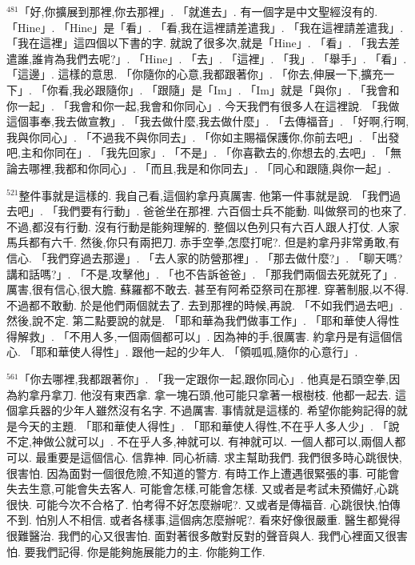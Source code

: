 \documentclass{book}
\begin{document}
$^{481}$「好,你擴展到那裡,你去那裡」.
「就進去」.
有一個字是中文聖經沒有的.
「Hine」.
「Hine」是「看」.
「看,我在這裡請差遣我」.
「我在這裡請差遣我」.
「我在這裡」這四個以下書的字.
就說了很多次,就是「Hine」.
「看」.
「我去差遣誰,誰肯為我們去呢?」.
「Hine」.
「去」.
「這裡」.
「我」.
「舉手」.
「看」.
「這邊」.
這樣的意思.
「你隨你的心意,我都跟著你」.
「你去,伸展一下,擴充一下」.
「你看,我必跟隨你」.
「跟隨」是「Im」.
「Im」就是「與你」.
「我會和你一起」.
「我會和你一起,我會和你同心」.
今天我們有很多人在這裡說.
「我做這個事奉,我去做宣教」.
「我去做什麼,我去做什麼」.
「去傳福音」.
「好啊,行啊,我與你同心」.
「不過我不與你同去」.
「你如主賜福保護你,你前去吧」.
「出發吧,主和你同在」.
「我先回家」.
「不是」.
「你喜歡去的,你想去的,去吧」.
「無論去哪裡,我都和你同心」.
「而且,我是和你同去」.
「同心和跟隨,與你一起」.

$^{521}$整件事就是這樣的.
我自己看,這個約拿丹真厲害.
他第一件事就是說.
「我們過去吧」.
「我們要有行動」.
爸爸坐在那裡.
六百個士兵不能動.
叫做祭司的也來了.
不過,都沒有行動.
沒有行動是能夠理解的.
整個以色列只有六百人跟人打仗.
人家馬兵都有六千.
然後,你只有兩把刀.
赤手空拳,怎麼打呢?.
但是約拿丹非常勇敢,有信心.
「我們穿過去那邊」.
「去人家的防營那裡」.
「那去做什麼?」.
「聊天嗎?講和話嗎?」.
「不是,攻擊他」.
「也不告訴爸爸」.
「那我們兩個去死就死了」.
厲害,很有信心,很大膽.
蘇羅都不敢去.
甚至有阿希亞祭司在那裡.
穿著制服,以不得.
不過都不敢動.
於是他們兩個就去了.
去到那裡的時候,再說.
「不如我們過去吧」.
然後,說不定.
第二點要說的就是.
「耶和華為我們做事工作」.
「耶和華使人得性得解救」.
「不用人多,一個兩個都可以」.
因為神的手,很厲害.
約拿丹是有這個信心.
「耶和華使人得性」.
跟他一起的少年人.
「領呱呱,隨你的心意行」.

$^{561}$「你去哪裡,我都跟著你」.
「我一定跟你一起,跟你同心」.
他真是石頭空拳,因為約拿丹拿刀.
他沒有東西拿.
拿一塊石頭,他可能只拿著一根樹枝.
他都一起去.
這個拿兵器的少年人雖然沒有名字.
不過厲害.
事情就是這樣的.
希望你能夠記得的就是今天的主題.
「耶和華使人得性」.
「耶和華使人得性,不在乎人多人少」.
「說不定,神做公就可以」.
不在乎人多,神就可以.
有神就可以.
一個人都可以,兩個人都可以.
最重要是這個信心.
信靠神.
同心祈禱.
求主幫助我們.
我們很多時心跳很快,很害怕.
因為面對一個很危險,不知道的警方.
有時工作上遭遇很緊張的事.
可能會失去生意,可能會失去客人.
可能會怎樣,可能會怎樣.
又或者是考試未預備好,心跳很快.
可能今次不合格了.
怕考得不好怎麼辦呢?.
又或者是傳福音.
心跳很快,怕傳不到.
怕別人不相信.
或者各樣事,這個病怎麼辦呢?.
看來好像很嚴重.
醫生都覺得很難醫治.
我們的心又很害怕.
面對著很多敵對反對的聲音與人.
我們心裡面又很害怕.
要我們記得.
你是能夠施展能力的主.
你能夠工作.
\end{document}
